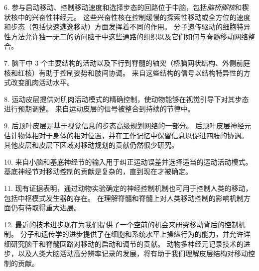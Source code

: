 6. 参与启动移动、控制移动速度和选择步态的回路位于中脑，包括\textit{脑桥脚核}和楔状核中的兴奋性神经元。
这些兴奋性核在控制缓慢的探索性移动或全方位的速度和步态（包括快速逃逸移动）方面发挥着不同的作用。
分子遗传驱动的细胞特异性方法允许独一无二的访问脑干中这些通路的组织以及它们如何与脊髓移动网络整合。


7. 脑干中 3 个主要结构的活动以及下行到脊髓的轴突（桥脑网状结构、外侧前庭核和红核）有助于控制姿势和肢间协调。
来自这些结构的信号以结构特异性的方式改变肌肉活动水平。


8. 运动皮层提供对肌肉活动模式的精确控制，使动物能够在视觉引导下对其步态进行预期调整。
来自运动皮层的信号被整合到持续的节律中。


9. 后顶叶皮层是基于视觉信息的步态高级规划网络的一部分。
后顶叶皮层神经元估计物体相对于身体的相对位置，并在工作记忆中保留信息以促进四肢的协调。
其他皮层和皮层下区域对移动规划的贡献仍然很少研究。


10. 来自小脑和基底神经节的输入用于纠正运动误差并选择适当的运动活动模式。
基底神经节对移动控制的贡献是复杂的，直到现在才被确定。


11. 现有证据表明，通过动物实验确定的神经控制机制也可用于控制人类的移动，包括中枢模式发生器的存在。
在理解脊髓和脊髓上对人类移动控制的影响机制方面仍有待取得重大进展。


12. 最近的技术进步现在为我们提供了一个空前的机会来研究移动背后的控制机制。
分子和遗传学的进步提供了在细胞和系统水平上操纵行为的能力，并允许详细研究脑干和脊髓回路对移动的启动和调节的贡献。
动物多神经元记录技术的进步，以及人类大脑活动高分辨率记录的发展，将有助于我们理解皮层结构对移动控制的贡献。

